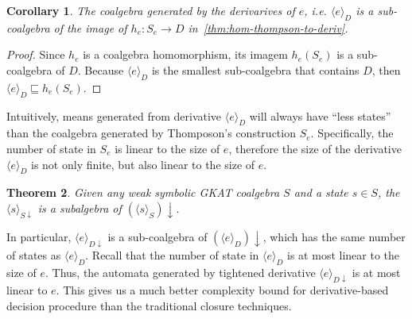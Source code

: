\documentclass{extarticle}
\newtheorem{theorem}{Theorem}
\newtheorem{corollary}[theorem]{Corollary}
\begin{document}
\begin{corollary}\label{thm:deriv-subcoalgebra-thomp}
    The coalgebra generated by the derivarives of \(e\), i.e. \(⟨e⟩_D\) is a sub-coalgebra of the image of \(h_e: S_e → D\) in~\cref{thm:hom-thompson-to-deriv}.
\end{corollary}

\begin{proof}
    Since \(h_e\) is a coalgebra homomorphism, its imagem \(h_e(S_e)\) is a sub-coalgebra of \(D\). 
    Because \(⟨e⟩_D\) is the smallest sub-coalgebra that contains \(D\), then \(⟨e⟩_D ⊑ h_e(S_e)\).
\end{proof}

Intuitively,  means generated from derivative \(⟨e⟩_D\) will always have ``less states'' than the coalgebra generated by Thomposon's construction \(S_e\). 
Specifically, the number of state in \(S_e\) is linear to the size of \(e\), therefore the size of the derivative \(⟨e⟩_D\) is not only finite, but also linear to the size of \(e\).

\begin{theorem}
    Given any weak symbolic GKAT coalgebra \(S\) and a state \(s ∈ S\), the \(⟨s⟩_{S\!↓}\) is a subalgebra of \((⟨s⟩_{S})\!↓\).
\end{theorem}

In particular, \(⟨e⟩_{D\!↓}\) is a sub-coalgebra of \((⟨e⟩_{D})\!↓\), which has the same number of states as \(⟨e⟩_{D}\). 
Recall that the number of state in \(⟨e⟩_{D}\) is at most linear to the size of \(e\). Thus, the automata generated by tightened derivative \(⟨e⟩_{D↓}\) is at most linear to \(e\).
This gives us a much better complexity bound for derivative-based decision procedure than the traditional closure techniques.
\end{document}
